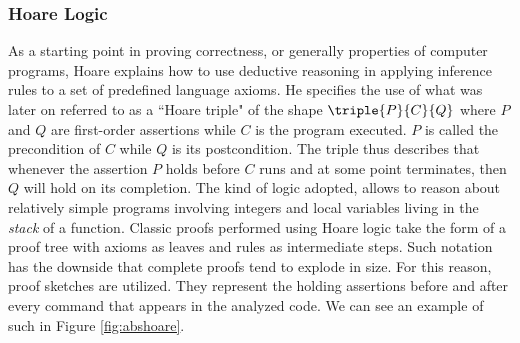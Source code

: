 \tocless\subsubsection{Hoare Logic}

As a starting point in proving correctness, or generally properties of computer programs, Hoare \cite{hoare} explains how to use deductive reasoning in applying inference rules to a set of predefined language axioms. He specifies the use of what was later on referred to as a ``Hoare triple" of the shape $\triple{P}{C}{Q}$ where $P$ and $Q$ are first-order assertions while $C$ is the program executed. $P$ is called the precondition of $C$ while $Q$ is its postcondition. The triple thus describes that whenever the assertion $P$ holds before $C$ runs and at some point terminates, then $Q$ will hold on its completion. The kind of logic adopted, allows to reason about relatively simple programs involving integers and local variables living in the \textit{stack} of a function. Classic proofs performed using Hoare logic take the form of a proof tree with axioms as leaves and rules as intermediate steps. Such notation has the downside that complete proofs tend to explode in size. For this reason, proof sketches are utilized. They represent the holding assertions before and after every command that appears in the analyzed code. We can see an example of such in Figure \ref{fig:abshoare}.
